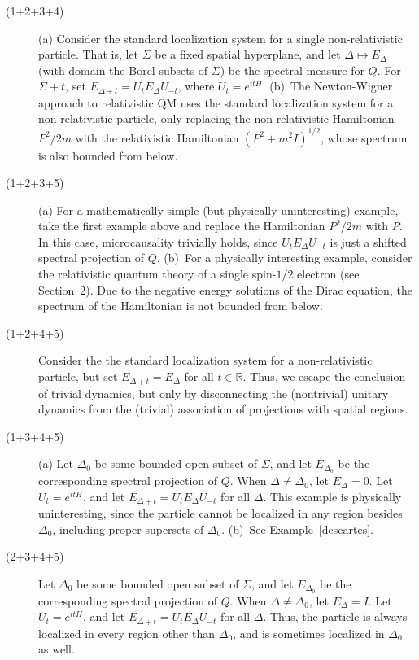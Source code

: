 \documentclass[11pt]{article}
\theoremstyle{remark}
\begin{document}
\begin{description}
\item[\textnormal{(1+2+3+4)}] (a) Consider the standard localization
  system for a single non-relativistic particle.  That is, let
  $\Sigma$ be a fixed spatial hyperplane, and let $\Delta \mapsto
  E_{\Delta}$ (with domain the Borel subsets of $\Sigma$) be the
  spectral measure for $Q$.  For $\Sigma +t$, set $E_{\Delta
    +t}=U_{t}E_{\Delta}U_{-t}$, where $U_{t}=e^{itH}$.  (b)~The
  Newton-Wigner approach to relativistic QM uses the standard
  localization system for a non-relativistic particle, only replacing
  the non-relativistic Hamiltonian $P^{2}/2m$ with the relativistic
  Hamiltonian $(P^{2}+m^{2}I)^{1/2}$, whose spectrum is also bounded
  from below.
\item[\textnormal{(1+2+3+5)}] (a) For a mathematically simple (but
  physically uninteresting) example, take the first example above and
  replace the Hamiltonian $P^{2}/2m$ with $P$.  In this case,
  microcausality trivially holds, since $U_{t}E_{\Delta}U_{-t}$ is
  just a shifted spectral projection of $Q$.  (b)~For a physically
  interesting example, consider the relativistic quantum theory of a
  single spin-$1/2$ electron (see Section~2).  Due to the negative
  energy solutions of the Dirac equation, the spectrum of the
  Hamiltonian is not bounded from below.
\item[\textnormal{(1+2+4+5)}] Consider the the standard localization
  system for a non-relativistic particle, but set $E_{\Delta
    +t}=E_{\Delta}$ for all $t\in \mathbb{R}$.  Thus, we escape the
  conclusion of trivial dynamics, but only by disconnecting the
  (nontrivial) unitary dynamics from the (trivial) association of
  projections with spatial regions.
\item[\textnormal{(1+3+4+5)}] (a) Let $\Delta _{0}$ be some bounded
  open subset of $\Sigma$, and let $E_{\Delta _{0}}$ be the
  corresponding spectral projection of $Q$.  When $\Delta \neq \Delta
  _{0}$, let $E_{\Delta}=0$.  Let $U_{t}=e^{itH}$, and let $E_{\Delta
    +t}=U_{t}E_{\Delta}U_{-t}$ for all $\Delta$.  This example is
  physically uninteresting, since the particle cannot be localized in
  any region besides $\Delta _{0}$, including proper supersets of
  $\Delta _{0}$.  (b)~See Example~\ref{descartes}.
\item[\textnormal{(2+3+4+5)}] Let $\Delta _{0}$ be some bounded open
  subset of $\Sigma$, and let $E_{\Delta _{0}}$ be the corresponding
  spectral projection of $Q$.  When $\Delta \neq \Delta _{0}$, let
  $E_{\Delta}=I$.  Let $U_{t}=e^{itH}$, and let $E_{\Delta
    +t}=U_{t}E_{\Delta}U_{-t}$ for all $\Delta$.  Thus, the particle
  is always localized in every region other than $\Delta _{0}$, and is
  sometimes localized in $\Delta _{0}$ as well.  \end{description}
\end{document}
